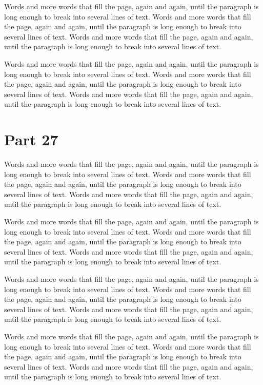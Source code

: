 \documentclass{article}
\begin{document}
Words and more words that fill the page, again and again, until the paragraph is long enough to break into several lines of text. Words and more words that fill the page, again and again, until the paragraph is long enough to break into several lines of text. Words and more words that fill the page, again and again, until the paragraph is long enough to break into several lines of text. 

Words and more words that fill the page, again and again, until the paragraph is long enough to break into several lines of text. Words and more words that fill the page, again and again, until the paragraph is long enough to break into several lines of text. Words and more words that fill the page, again and again, until the paragraph is long enough to break into several lines of text. 

\section{Part 27}
Words and more words that fill the page, again and again, until the paragraph is long enough to break into several lines of text. Words and more words that fill the page, again and again, until the paragraph is long enough to break into several lines of text. Words and more words that fill the page, again and again, until the paragraph is long enough to break into several lines of text. 

Words and more words that fill the page, again and again, until the paragraph is long enough to break into several lines of text. Words and more words that fill the page, again and again, until the paragraph is long enough to break into several lines of text. Words and more words that fill the page, again and again, until the paragraph is long enough to break into several lines of text. 

Words and more words that fill the page, again and again, until the paragraph is long enough to break into several lines of text. Words and more words that fill the page, again and again, until the paragraph is long enough to break into several lines of text. Words and more words that fill the page, again and again, until the paragraph is long enough to break into several lines of text. 

Words and more words that fill the page, again and again, until the paragraph is long enough to break into several lines of text. Words and more words that fill the page, again and again, until the paragraph is long enough to break into several lines of text. Words and more words that fill the page, again and again, until the paragraph is long enough to break into several lines of text. 
\end{document}
